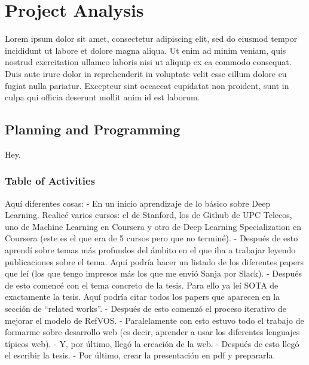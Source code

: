 

\chapter{Project Analysis}\label{cha:analysis}



\drop Lorem ipsum dolor sit amet, consectetur adipiscing elit, sed do eiusmod
tempor incididunt ut labore et dolore magna aliqua. Ut enim ad minim veniam,
quis nostrud exercitation ullamco laboris nisi ut aliquip ex ea commodo
consequat. Duis aute irure dolor in reprehenderit in voluptate velit esse
cillum dolore eu fugiat nulla pariatur. Excepteur sint occaecat cupidatat non
proident, sunt in culpa qui officia deserunt mollit anim id est laborum.



\section{Planning and Programming}

Hey.


\subsection{Table of Activities}

Aquí diferentes cosas:
- En un inicio aprendizaje de lo básico sobre Deep Learning. Realicé varios
cursos: el de Stanford, los de Github de UPC Telecos, uno de Machine Learning
en Coursera y otro de Deep Learning Specialization en Coursera (este es el que
era de 5 cursos pero que no terminé).
- Después de esto aprendí sobre temas más profundos del ámbito en el que iba a
trabajar leyendo publicaciones sobre el tema. Aquí podría hacer un listado de
los diferentes papers que leí (los que tengo impresos más los que me envió
Sanja por Slack).
- Después de esto comencé con el tema concreto de la tesis. Para ello ya leí
SOTA de exactamente la tesis. Aquí podría citar todos los papers que aparecen
en la sección de ``related works''.
- Después de esto comenzó el proceso iterativo de mejorar el modelo de RefVOS.
- Paralelamente con esto estuvo todo el trabajo de formarme sobre desarrollo
web (es decir, aprender a usar los diferentes lenguajes típicos web).
- Y, por último, llegó la creación de la web.
- Después de esto llegó el escribir la tesis.
- Por último, crear la presentación en pdf y prepararla.


